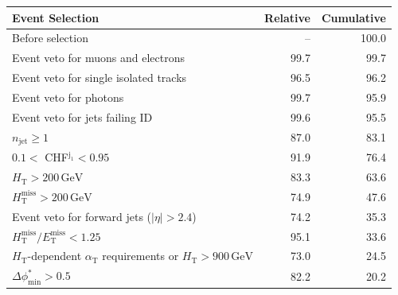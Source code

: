 \begin{table}[p]
    \begin{center}
        \begin{tabular}{lrr}
      \hline
                                                                                               Event Selection &  Relative &  Cumulative \\
      \hline
                                                                                             Before selection  &         -- &      100.0 \\
                                                                            Event veto for muons and electrons &       99.7 &       99.7 \\
                                                                         Event veto for single isolated tracks &       96.5 &       96.2 \\
                                                                                        Event veto for photons &       99.7 &       95.9 \\
                                                                                Event veto for jets failing ID &       99.6 &       95.5 \\
                                                                                     $n_{\mathrm{jet}} \geq 1$ &       87.0 &       83.1 \\
                                                                           $0.1 <$ CHF$^{\mathrm{j_1}} < 0.95$ &       91.9 &       76.4 \\
                                                                          $H_{\mathrm{T}} > 200\,\mathrm{GeV}$ &       83.3 &       63.6 \\
                                                          $H_{\mathrm{T}}^{\mathrm{miss}} > 200\,\mathrm{GeV}$ &       74.9 &       47.6 \\
                                                                  Event veto for forward jets ($|\eta| > 2.4$) &       74.2 &       35.3 \\
                                      $H_{\mathrm{T}}^{\mathrm{miss}} / E_{\mathrm{T}}^{\mathrm{miss}} < 1.25$ &       95.1 &       33.6 \\
         $H_{\mathrm{T}}$-dependent $\alpha_{\mathrm{T}}$ requirements or $H_{\mathrm{T}} > 900\,\mathrm{GeV}$ &       73.0 &       24.5 \\
                                                                         $\Delta\phi^{*}_{\mathrm{min}} > 0.5$ &       82.2 &       20.2 \\

\end{tabular}
\end{center}
\end{table}
